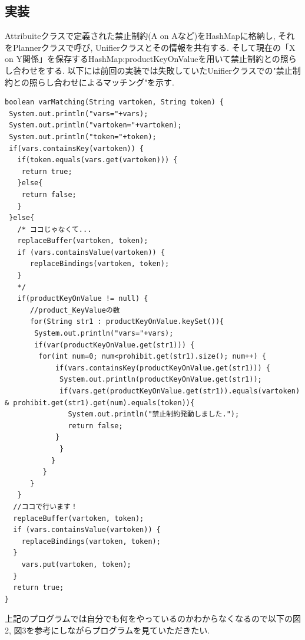 \documentclass[12pt]{jarticle}
\begin{document}
\subsection{実装}
Attribuiteクラスで定義された禁止制約(A on Aなど)をHashMapに格納し, それをPlannerクラスで呼び, Unifierクラスとその情報を共有する. そして現在の「X on Y関係」を保存するHashMap:productKeyOnValueを用いて禁止制約との照らし合わせをする. 以下には前回の実装では失敗していたUnifierクラスでの"禁止制約との照らし合わせによるマッチング"を示す.
\begin{lstlisting}[caption=UnifierクラスのvarMatchingメソッド, label=src:No1]
boolean varMatching(String vartoken, String token) {
 System.out.println("vars="+vars);
 System.out.println("vartoken="+vartoken);
 System.out.println("token="+token);
 if(vars.containsKey(vartoken)) {
   if(token.equals(vars.get(vartoken))) {
	return true;
   }else{
	return false;
   }
 }else{
   /* ココじゃなくて...
   replaceBuffer(vartoken, token);
   if (vars.containsValue(vartoken)) {
      replaceBindings(vartoken, token);
   }
   */
   if(productKeyOnValue != null) {
      //product_KeyValueの数
      for(String str1 : productKeyOnValue.keySet()){	
	   System.out.println("vars="+vars);
	   if(var(productKeyOnValue.get(str1))) {
		for(int num=0; num<prohibit.get(str1).size(); num++) {
		    if(vars.containsKey(productKeyOnValue.get(str1))) {
		     System.out.println(productKeyOnValue.get(str1));
		     if(vars.get(productKeyOnValue.get(str1)).equals(vartoken) & prohibit.get(str1).get(num).equals(token)){
			   System.out.println("禁止制約発動しました.");
			   return false;
			}
		     }
	       }
	     }
      }
   }
  //ココで行います！
  replaceBuffer(vartoken, token);
  if (vars.containsValue(vartoken)) {
	replaceBindings(vartoken, token);
  }
	vars.put(vartoken, token);
  }
  return true;
}
\end{lstlisting}

上記のプログラムでは自分でも何をやっているのかわからなくなるので以下の図2, 図3を参考にしながらプログラムを見ていただきたい.
\end{document}
